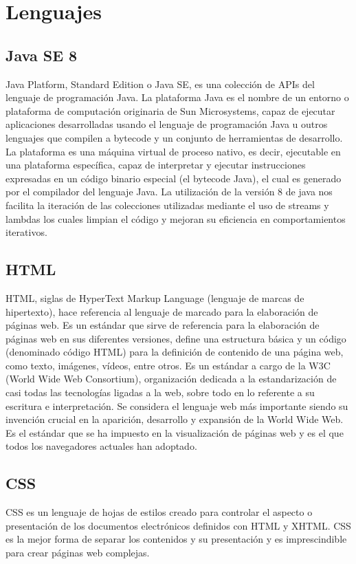 \documentclass[12pt, a4paper, twoside]{book}
\begin{document}
	\section{Lenguajes}
	\subsection{Java SE 8}
	Java Platform, Standard Edition o Java SE, es una colección de APIs del lenguaje de
	programación Java. La plataforma Java es el nombre de un entorno o plataforma de computación
	originaria de Sun Microsystems, capaz de ejecutar aplicaciones desarrolladas usando el
	lenguaje de programación Java u outros lenguajes que compilen a bytecode y un conjunto
	de herramientas de desarrollo. La plataforma es una máquina virtual de proceso nativo, es decir, ejecutable en una plataforma específica, capaz de interpretar y ejecutar instrucciones expresadas en un código binario especial (el bytecode Java), el cual es generado por el compilador del lenguaje Java.\cite{Java}
	La utilización de la versión 8 de java nos facilita la iteración de las colecciones utilizadas mediante el uso de streams y lambdas los cuales limpian el código y mejoran su eficiencia en comportamientos iterativos.
	\subsection{HTML}
	HTML, siglas de HyperText Markup Language (lenguaje de marcas de
	hipertexto), hace referencia al lenguaje de marcado para la elaboración de páginas
	web. Es un estándar que sirve de referencia para la elaboración de páginas web
	en sus diferentes versiones, define una estructura básica y un código (denominado
	código HTML) para la definición de contenido de una página web, como texto,
	imágenes, vídeos, entre otros. Es un estándar a cargo de la W3C (World Wide
	Web Consortium), organización dedicada a la estandarización de casi todas
	las tecnologías ligadas a la web, sobre todo en lo referente a su escritura e
	interpretación. Se considera el lenguaje web más importante siendo su invención
	crucial en la aparición, desarrollo y expansión de la World Wide Web. Es el
	estándar que se ha impuesto en la visualización de páginas web y es el que todos
	los navegadores actuales han adoptado.\cite{HTML}
	\subsection{CSS}
	CSS es un lenguaje de hojas de estilos creado para controlar el aspecto o presentación de los documentos electrónicos definidos con HTML y XHTML. CSS es la mejor forma de separar los contenidos y su presentación y es imprescindible para crear páginas web complejas.
	
\end{document}
